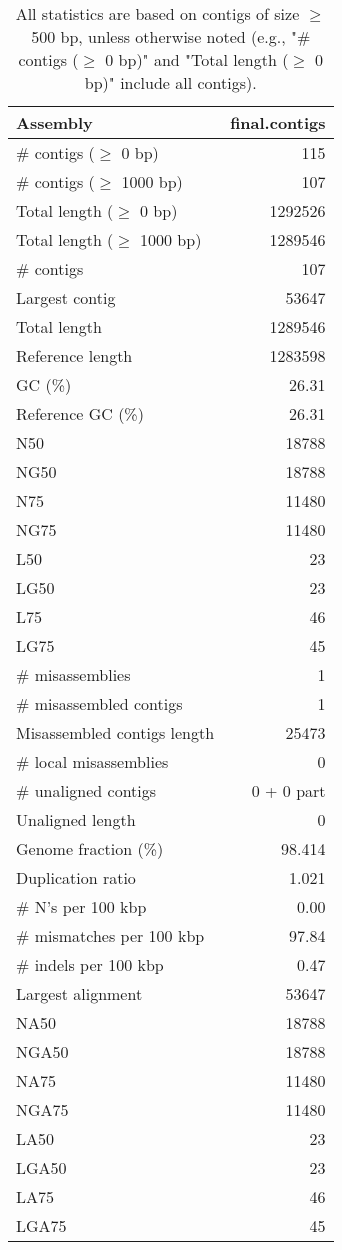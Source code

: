 \documentclass[12pt,a4paper]{article}
\begin{document}
\begin{table}[ht]
\begin{center}
\caption{All statistics are based on contigs of size $\geq$ 500 bp, unless otherwise noted (e.g., "\# contigs ($\geq$ 0 bp)" and "Total length ($\geq$ 0 bp)" include all contigs).}
\begin{tabular}{|l*{1}{|r}|}
\hline
Assembly & final.contigs \\ \hline
\# contigs ($\geq$ 0 bp) & 115 \\ \hline
\# contigs ($\geq$ 1000 bp) & 107 \\ \hline
Total length ($\geq$ 0 bp) & 1292526 \\ \hline
Total length ($\geq$ 1000 bp) & 1289546 \\ \hline
\# contigs & 107 \\ \hline
Largest contig & 53647 \\ \hline
Total length & 1289546 \\ \hline
Reference length & 1283598 \\ \hline
GC (\%) & 26.31 \\ \hline
Reference GC (\%) & 26.31 \\ \hline
N50 & 18788 \\ \hline
NG50 & 18788 \\ \hline
N75 & 11480 \\ \hline
NG75 & 11480 \\ \hline
L50 & 23 \\ \hline
LG50 & 23 \\ \hline
L75 & 46 \\ \hline
LG75 & 45 \\ \hline
\# misassemblies & 1 \\ \hline
\# misassembled contigs & 1 \\ \hline
Misassembled contigs length & 25473 \\ \hline
\# local misassemblies & 0 \\ \hline
\# unaligned contigs & 0 + 0 part \\ \hline
Unaligned length & 0 \\ \hline
Genome fraction (\%) & 98.414 \\ \hline
Duplication ratio & 1.021 \\ \hline
\# N's per 100 kbp & 0.00 \\ \hline
\# mismatches per 100 kbp & 97.84 \\ \hline
\# indels per 100 kbp & 0.47 \\ \hline
Largest alignment & 53647 \\ \hline
NA50 & 18788 \\ \hline
NGA50 & 18788 \\ \hline
NA75 & 11480 \\ \hline
NGA75 & 11480 \\ \hline
LA50 & 23 \\ \hline
LGA50 & 23 \\ \hline
LA75 & 46 \\ \hline
LGA75 & 45 \\ \hline
\end{tabular}
\end{center}
\end{table}
\end{document}
